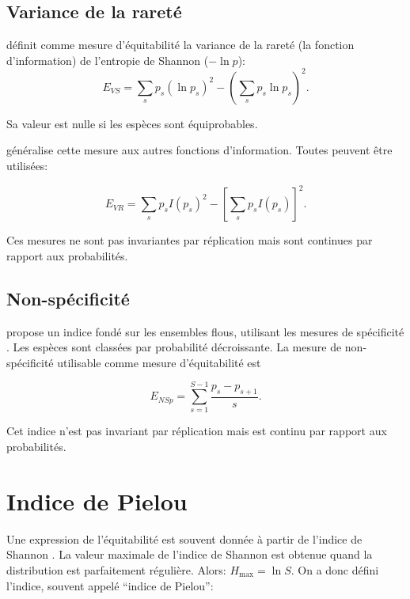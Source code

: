 \documentclass[
  11pt,
  french,
  a4paper,
  extrafontsizes,onecolumn,openright
  ]{memoir}
\newlength{\rf}
\begin{document}
\subsection{Variance de la rareté}\label{variance-de-la-raretuxe9}

\textcite{Engen1977} définit comme mesure d'équitabilité la variance de la rareté (la fonction d'information) de l'entropie de Shannon (\(-\ln p\)):
\begin{equation}
  \label{eq:Engen1977}
  E_\mathit{VS} = \sum_{s}{p_s(\ln p_s)^2}-(\sum_s{p_s \ln p_s})^2.
\end{equation}

Sa valeur est nulle si les espèces sont équiprobables.

\textcite{Ricotta2003b} généralise cette mesure aux autres fonctions d'information.
Toutes peuvent être utilisées:

\begin{equation}
  \label{eq:Ricotta2003b}
  E_\mathit{VR} = \sum_{s}{p_s I(p_s)^2}-[\sum_s{p_s I(p_s)}]^2.
\end{equation}

Ces mesures ne sont pas invariantes par réplication mais sont continues par rapport aux probabilités.

\subsection{Non-spécificité}\label{non-spuxe9cificituxe9}

\textcite{Ricotta2004} propose un indice fondé sur les ensembles flous, utilisant les mesures de spécificité \autocite{Yager1992}.
Les espèces sont classées par probabilité décroissante. La mesure de non-spécificité utilisable comme mesure d'équitabilité est

\begin{equation}
  \label{eq:Ricotta2004}
  E_\mathit{NSp} = \sum_{s=1}^{S-1}{\frac{p_s-p_{s+1}}{s}}.
\end{equation}

Cet indice n'est pas invariant par réplication mais est continu par rapport aux probabilités.

\section{Indice de Pielou}\label{indice-de-pielou}

Une expression de l'équitabilité est souvent donnée à partir de l'indice de Shannon \autocite{Lloyd1964,Sheldon1969,Pielou1966a,Pielou1975}.
La valeur maximale de l'indice de Shannon est obtenue quand la distribution est parfaitement régulière.
Alors: \(H_{\max}=\ln S\).
On a donc défini l'indice, souvent appelé ``indice de Pielou'':
\end{document}

